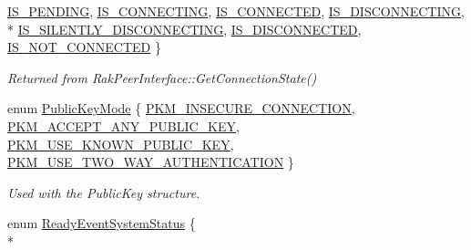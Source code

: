 \begin{DoxyCompactItemize}
\hyperlink{namespace_rak_net_a84a0fb005391f71130dd341f77f62138a41122f01ef32b9c407cddd0e9182876b}{I\-S\-\_\-\-P\-E\-N\-D\-I\-N\-G}, 
\hyperlink{namespace_rak_net_a84a0fb005391f71130dd341f77f62138a2b53e3b7cb8ed3e43207fe5ed08893af}{I\-S\-\_\-\-C\-O\-N\-N\-E\-C\-T\-I\-N\-G}, 
\hyperlink{namespace_rak_net_a84a0fb005391f71130dd341f77f62138ad547bfb144fa5b169991b179fda0d007}{I\-S\-\_\-\-C\-O\-N\-N\-E\-C\-T\-E\-D}, 
\hyperlink{namespace_rak_net_a84a0fb005391f71130dd341f77f62138a52bfe2ab90f28b8ebff543809829f7f0}{I\-S\-\_\-\-D\-I\-S\-C\-O\-N\-N\-E\-C\-T\-I\-N\-G}, 
\\*
\hyperlink{namespace_rak_net_a84a0fb005391f71130dd341f77f62138afe8d758dec1c59c14662ea85b5ff883e}{I\-S\-\_\-\-S\-I\-L\-E\-N\-T\-L\-Y\-\_\-\-D\-I\-S\-C\-O\-N\-N\-E\-C\-T\-I\-N\-G}, 
\hyperlink{namespace_rak_net_a84a0fb005391f71130dd341f77f62138a82261f4327b53e538c68b233d09aa9ea}{I\-S\-\_\-\-D\-I\-S\-C\-O\-N\-N\-E\-C\-T\-E\-D}, 
\hyperlink{namespace_rak_net_a84a0fb005391f71130dd341f77f62138ae10c6ccb6cfa04d2f55306773457456b}{I\-S\-\_\-\-N\-O\-T\-\_\-\-C\-O\-N\-N\-E\-C\-T\-E\-D}
 \}
\begin{DoxyCompactList}\small\item\em Returned from Rak\-Peer\-Interface\-::\-Get\-Connection\-State() \end{DoxyCompactList}\item 
enum \hyperlink{namespace_rak_net_a415b479158fd361610df230a53b35b02}{Public\-Key\-Mode} \{ \hyperlink{namespace_rak_net_a415b479158fd361610df230a53b35b02a3f17d85881df517153e6a1b08a4bc165}{P\-K\-M\-\_\-\-I\-N\-S\-E\-C\-U\-R\-E\-\_\-\-C\-O\-N\-N\-E\-C\-T\-I\-O\-N}, 
\hyperlink{namespace_rak_net_a415b479158fd361610df230a53b35b02a46fe00b3d7ebc580008d591e9b16d505}{P\-K\-M\-\_\-\-A\-C\-C\-E\-P\-T\-\_\-\-A\-N\-Y\-\_\-\-P\-U\-B\-L\-I\-C\-\_\-\-K\-E\-Y}, 
\hyperlink{namespace_rak_net_a415b479158fd361610df230a53b35b02a62028368b6f6f9ec461c6d982aca2e89}{P\-K\-M\-\_\-\-U\-S\-E\-\_\-\-K\-N\-O\-W\-N\-\_\-\-P\-U\-B\-L\-I\-C\-\_\-\-K\-E\-Y}, 
\hyperlink{namespace_rak_net_a415b479158fd361610df230a53b35b02add05a6daf150749ca2def6a48a4dd968}{P\-K\-M\-\_\-\-U\-S\-E\-\_\-\-T\-W\-O\-\_\-\-W\-A\-Y\-\_\-\-A\-U\-T\-H\-E\-N\-T\-I\-C\-A\-T\-I\-O\-N}
 \}
\begin{DoxyCompactList}\small\item\em Used with the Public\-Key structure. \end{DoxyCompactList}\item 
enum \hyperlink{group___r_e_a_d_y___e_v_e_n_t___g_r_o_u_p_gaf87e91389822570de07c01ccb37b0bbf}{Ready\-Event\-System\-Status} \{ \\*

\end{DoxyCompactItemize}
